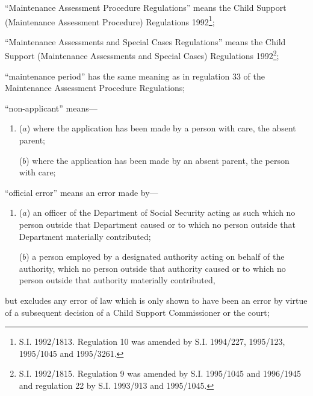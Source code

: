 \documentclass[12pt,a4paper]{article}
\begin{document}
\begin{enumerate}
“Maintenance Assessment Procedure Regulations” means the Child Support
(Maintenance Assessment Procedure) Regulations 1992\footnote{\frenchspacing S.I. 1992/1813. Regulation 10 was amended by S.I. 1994/227, 1995/123, 1995/1045 and 1995/3261.};

“Maintenance Assessments and Special Cases Regulations” means the Child Support
(Maintenance Assessments and Special Cases) Regulations 1992\footnote{\frenchspacing S.I. 1992/1815. Regulation 9 was amended by S.I. 1995/1045 and 1996/1945 and regulation 22 by S.I. 1993/913 and 1995/1045.};

“maintenance period” has the same meaning as in regulation 33 of the Maintenance
Assessment Procedure Regulations;

“non-applicant” means—
\begin{enumerate}\item[]
($a$) where the application has been made by a person with care, the absent parent;

($b$) where the application has been made by an absent parent, the person with
care;
\end{enumerate}


“official error” means an error made by—
\begin{enumerate}\item[]
    ($a$) 
    an officer of the Department of Social Security acting as such which no person outside that Department caused or to which no person outside that Department materially contributed;


($b$) a person employed by a designated authority acting on behalf of the authority, which no person outside that authority caused or to which no person outside that authority materially contributed,
\end{enumerate}
but excludes any error of law which is only shown to have been an error by virtue of a subsequent decision of a Child Support Commissioner or the court;


\end{enumerate}
\end{document}
